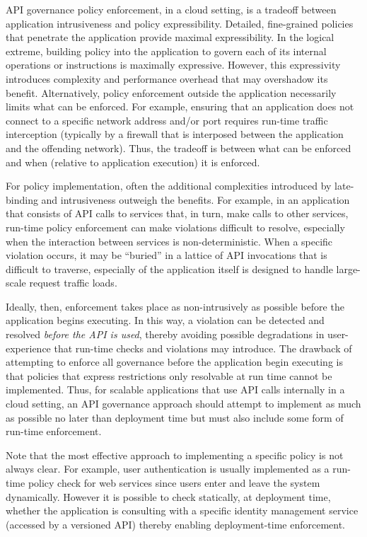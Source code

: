 API governance policy enforcement, in a cloud setting, is a tradeoff between
application intrusiveness and policy expressibility.  Detailed, fine-grained
policies that penetrate the application provide maximal expressibility.
In the logical extreme, building policy into the application to govern each of
its internal operations or instructions is maximally expressive.  However, this 
expressivity
introduces complexity and performance overhead that may overshadow its
benefit.  Alternatively, policy enforcement outside the application
necessarily limits what can be enforced.  For example, ensuring that an
application does not connect to a specific network address and/or port
requires run-time traffic interception (typically by a firewall that is
interposed between the application and the offending network).
Thus, the tradeoff is between what can be enforced and when (relative to
application execution) it is enforced.

For policy implementation, often the additional complexities introduced by
late-binding and intrusiveness outweigh the benefits.  For example, in an
application that consists of API calls to services that, in turn, make calls
to other services, run-time policy enforcement can make violations difficult
to resolve, especially when the interaction between services is
non-deterministic.  When a specific violation occurs, it may be ``buried'' in a
lattice of API invocations that is difficult to traverse, especially of the
application itself is designed to handle large-scale request traffic loads.

Ideally, then, enforcement takes place as non-intrusively as possible before
the application begins executing.  In this way, a violation can be detected and
resolved \textit{before the API is used}, thereby avoiding possible
degradations in user-experience that run-time checks and violations may
introduce.  The drawback of attempting to enforce all governance before the
application begin executing is that policies that express restrictions only
resolvable at run time cannot be implemented.  
Thus, for scalable applications that use API calls internally in a cloud
setting, an API governance approach should attempt to implement as much as
possible no later than deployment time but must also include some form of
run-time enforcement.  

Note that the most effective approach to implementing a specific policy is not
always clear.  For example, user authentication is usually implemented as a
run-time policy check for web services since users enter and leave the system dynamically.
However it is possible to check statically, at deployment time, whether the
application is consulting with a specific identity management service (accessed
by a versioned API) thereby enabling deployment-time enforcement.


